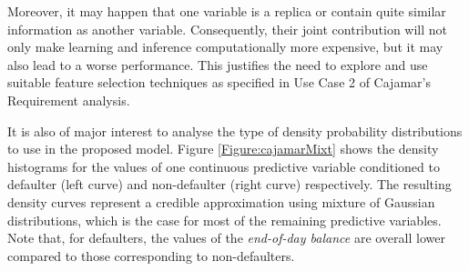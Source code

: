 %

%


Moreover, it may happen that one variable is a replica or contain quite similar information as another variable. Consequently, their joint contribution will not only make learning and inference computationally more expensive, but it may also lead to a worse performance. This justifies the need to explore and use suitable feature selection techniques as specified in Use Case 2 of Cajamar's Requirement analysis\cite{Fer14b}.

It is also of major interest to analyse the type of density probability distributions to use in the proposed model. Figure \ref{Figure:cajamarMixt} shows the density histograms for the values of one continuous predictive variable conditioned to defaulter (left curve) and non-defaulter (right curve) respectively. The resulting density curves represent a credible approximation using mixture of Gaussian distributions, which is the case for most of the remaining predictive variables. Note that, for defaulters, the values of the \emph{end-of-day balance} are overall lower compared to those corresponding to non-defaulters.

